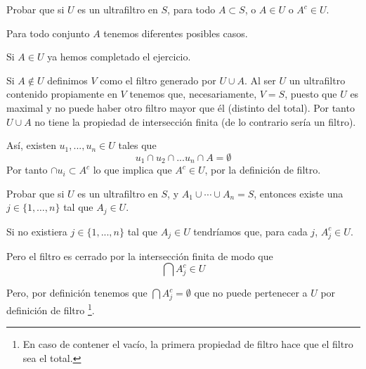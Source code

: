 \begin{problem}
Probar que si $U$ es un ultrafiltro en $S$, para todo $A\subset S$, o $A\in U$ o $A^c\in U$.

\solution

Para todo conjunto $A$ tenemos diferentes posibles casos.

Si $A \in U$ ya hemos completado el ejercicio.

Si $A \notin U$ definimos $V$ como el filtro generado por $U \cup A$. Al ser $U$ un ultrafiltro contenido propiamente en $V$ tenemos que, necesariamente, $V=S$, puesto que $U$ es maximal y no puede haber otro filtro mayor que él (distinto del total). Por tanto $U \cup A$ no tiene la propiedad de intersección finita (de lo contrario sería un filtro).

Así, existen $u_1,...,u_n \in U$ tales que
\[u_1\cap u_2 \cap ... u_n \cap A = \emptyset\]
Por tanto $\cap u_i \subset A^c$ lo que implica que $A^c \in U$, por la definición de filtro.
\end{problem}

\begin{problem}
Probar que si $U$ es un ultrafiltro en $S$, y  $A_1 \cup \cdots \cup A_n = S$, entonces existe una $j\in \{ 1, \dots, n\}$ tal que
$A_j\in U$.

\solution

Si no existiera $j\in \{1,...,n\}$ tal que $A_j \in U$ tendríamos que, para cada $j$, $A_j^c \in U$.

Pero el filtro es cerrado por la intersección finita de modo que
\[\bigcap A_j^c \in U\]

Pero, por definición tenemos que $\bigcap A_j^c = \emptyset$ que no puede pertenecer a $U$ por definición de filtro \footnote{En caso de contener el vacío, la primera propiedad de filtro hace que el filtro sea el total.}.

\end{problem}

